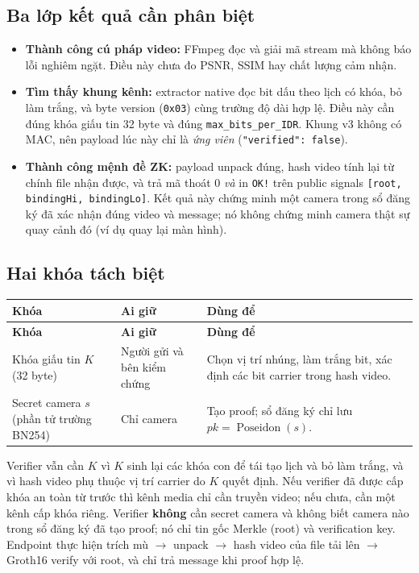 \documentclass[11pt,a4paper]{article}
\begin{document}
\subsection{Ba lớp kết quả cần phân biệt}

\begin{itemize}
  \item \textbf{Thành công cú pháp video:} FFmpeg đọc và giải mã stream mà không
  báo lỗi nghiêm ngặt. Điều này chưa đo PSNR, SSIM hay chất lượng cảm nhận.
  \item \textbf{Tìm thấy khung kênh:} extractor native đọc bit dấu theo lịch có khóa,
  bỏ làm trắng, và byte version (\texttt{0x03}) cùng trường độ dài hợp lệ. Điều này
  cần đúng khóa giấu tin 32 byte và đúng \texttt{max\_bits\_per\_IDR}. Khung v3 không
  có MAC, nên payload lúc này chỉ là \emph{ứng viên} (\texttt{"verified": false}).
  \item \textbf{Thành công mệnh đề ZK:} payload unpack đúng, hash video tính lại từ
  chính file nhận được, và  trả mã thoát 0 \emph{và} in
  \texttt{OK!} trên public signals \texttt{[root, bindingHi, bindingLo]}. Kết quả này
  chứng minh một camera trong sổ đăng ký đã xác nhận đúng video và message; nó không
  chứng minh camera thật sự quay cảnh đó (ví dụ quay lại màn hình).
\end{itemize}

\subsection{Hai khóa tách biệt}

\begin{longtable}{P{.27\textwidth}P{.25\textwidth}P{.39\textwidth}}
\toprule\textbf{Khóa} & \textbf{Ai giữ} & \textbf{Dùng để} \\
\midrule\endfirsthead
\toprule\textbf{Khóa} & \textbf{Ai giữ} & \textbf{Dùng để} \\
\midrule\endhead
Khóa giấu tin $K$ (32 byte) & Người gửi và bên kiểm chứng & Chọn vị trí nhúng, làm trắng bit, xác định các bit carrier trong hash video. \\
Secret camera $s$ (phần tử trường BN254) & Chỉ camera & Tạo proof; sổ đăng ký chỉ lưu $pk=\operatorname{Poseidon}(s)$. \\
\bottomrule\end{longtable}

Verifier vẫn cần $K$ vì $K$ sinh lại các khóa con để tái tạo lịch và bỏ làm trắng, và
vì hash video phụ thuộc vị trí carrier do $K$ quyết định. Nếu verifier đã được cấp
khóa an toàn từ trước thì kênh media chỉ cần truyền video; nếu chưa, cần một kênh cấp
khóa riêng. Verifier \textbf{không} cần secret camera và không biết camera nào trong
sổ đăng ký đã tạo proof; nó chỉ tin gốc Merkle (root) và verification key.
Endpoint  thực hiện trích mù $\to$ unpack $\to$ hash video
của file tải lên $\to$ Groth16 verify với root, và chỉ trả message khi proof hợp lệ.
\end{document}
